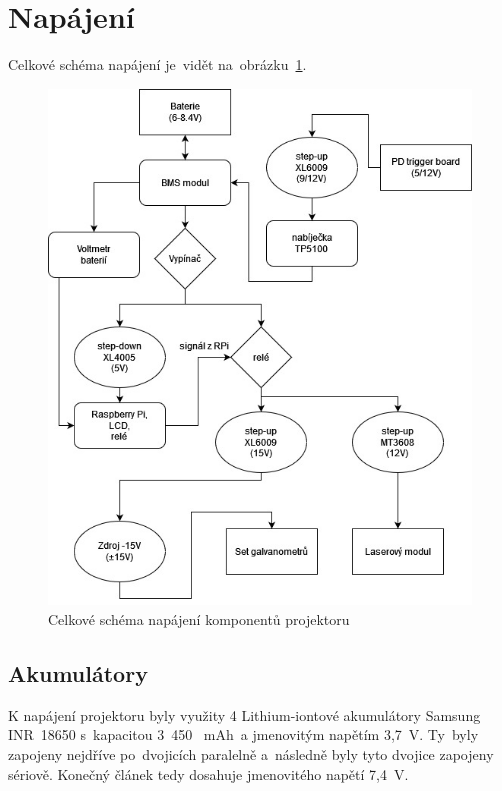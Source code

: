 \section{Napájení}
Celkové schéma napájení je~vidět na~obrázku~\ref{fig:power-schem-full}.

\begin{figure}[!h]
  \centering
  \includegraphics[width=\textwidth]{img/power-schem-full.jpg}
  \caption{\label{fig:power-schem-full} Celkové schéma napájení komponentů projektoru}
\end{figure}

\subsection{Akumulátory}
K napájení projektoru byly využity 4 Lithium-iontové akumulátory Samsung INR~18650 s~kapacitou 3~450 ~mAh~a jmenovitým napětím 3,7~V. Ty~byly zapojeny nejdříve po~dvojicích paralelně a~následně byly tyto dvojice zapojeny sériově. Konečný článek tedy dosahuje jmenovitého napětí 7,4~V.

